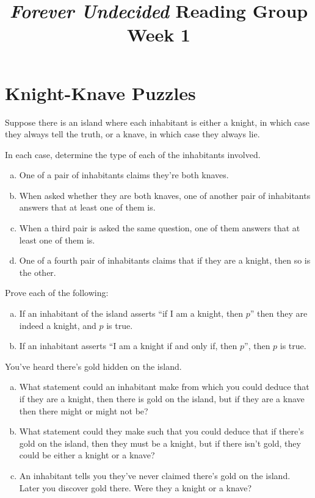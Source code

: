 \documentclass{article}
\title{\emph{Forever Undecided} Reading Group \\ Week 1}
\date{}
\begin{document}
\maketitle

\section*{Knight-Knave Puzzles}
Suppose there is an island where each inhabitant is either a knight, in which case they always tell the truth, or a knave, in which case they always lie.

\begin{prob}{1.1}
    In each case, determine the type of each of the inhabitants involved.
    \begin{enumerate}[a)]
        \item One of a pair of inhabitants claims they're both knaves.
        \item When asked whether they are both knaves, one of another pair of inhabitants answers that at least one of them is.
        \item When a third pair is asked the same question, one of them answers that at least one of them is.
        \item One of a fourth pair of inhabitants claims that if they are a knight, then so is the other.
    \end{enumerate}
\end{prob}

\begin{prob}{1.2}
    Prove each of the following:
    \begin{enumerate}[a)]
        \item If an inhabitant of the island asserts ``if I am a knight, then $p$'' then they are indeed a knight, and $p$ is true.
        \item If an inhabitant asserts ``I am a knight if and only if, then $p$'', then $p$ is true.
    \end{enumerate}
\end{prob}

\begin{prob}{1.3}
    You've heard there's gold hidden on the island.
    \begin{enumerate}[a)]
        \item What statement could an inhabitant make from which you could deduce that if they are a knight, then there is gold on the island, but if they are a knave then there might or might not be?
        \item What statement could they make such that you could deduce that if there's gold on the island, then they must be a knight, but if there isn't gold, they could be either a knight or a knave?
        \item An inhabitant tells you they've never claimed there's gold on the island. Later you discover gold there. Were they a knight or a knave?
    \end{enumerate}
\end{prob}
\end{document}
